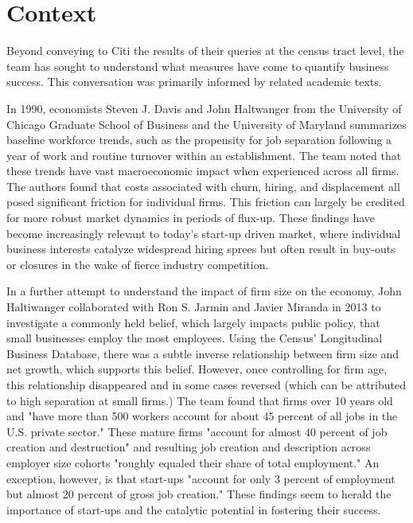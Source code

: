 \documentclass[article, 11pt]{article} %
\begin{document}

\section*{Context}

Beyond conveying to Citi the results of their queries at the census tract level, the team has sought to understand what measures have come to quantify business success. This conversation was primarily informed by related academic texts.

In 1990, economists Steven J. Davis and John Haltwanger from the University of Chicago Graduate School of Business and the University of Maryland summarizes baseline workforce trends, such as the propensity for job separation following a year of work and routine turnover within an establishment. The team noted that these trends have vast macroeconomic impact when experienced across all firms. The authors found that costs associated with churn, hiring, and displacement all posed significant friction for individual firms. \cite{Davis} This friction can largely be credited for more robust market dynamics in periods of flux-up. These findings have become increasingly relevant to today's start-up driven market, where individual business interests catalyze widespread hiring sprees but often result in buy-outs or closures in the wake of fierce industry competition.

In a further attempt to understand the impact of firm size on the economy, John Haltiwanger collaborated with Ron S. Jarmin and Javier Miranda in 2013 to investigate a commonly held belief, which largely impacts public policy, that small businesses employ the most employees. Using the Census' Longitudinal Business Database, there was a subtle inverse relationship between firm size and net growth, which supports this belief. However, once controlling for firm age, this relationship disappeared and in some cases reversed (which can be attributed to high separation at small firms.) The team found that firms over 10 years old and "have more than 500 workers account for about 45 percent of all jobs in the U.S. private sector." These mature firms "account for almost 40 percent of job creation and destruction" and resulting job creation and description across employer size cohorts "roughly equaled their share of total employment." An exception, however, is that start-ups "account for only 3 percent of employment but almost 20 percent of gross job creation." \cite{Haltiwanger} These findings seem to herald the importance of start-ups and the catalytic potential in fostering their success.
\end{document}
